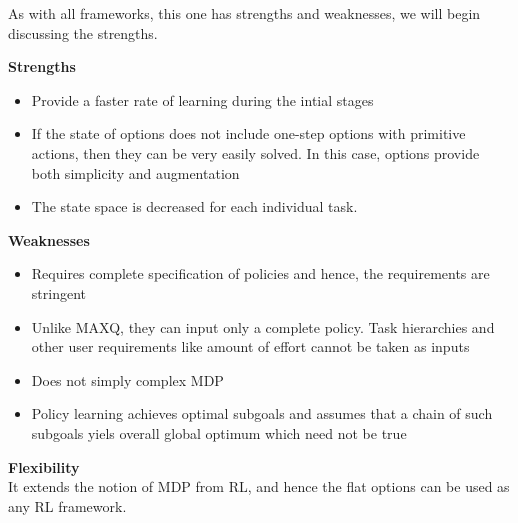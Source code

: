 As with all frameworks, this one has strengths and weaknesses, we will begin discussing the strengths.

\textbf{Strengths}
\begin{itemize}
    \item Provide a faster rate of learning during the intial stages
    \item If the state of options does not include one-step options with primitive actions, then they can be very easily solved. In this case, options provide both simplicity and augmentation
    \item The state space is decreased for each individual task.
\end{itemize}

\textbf{Weaknesses}
\begin{itemize}
    \item Requires complete specification of policies and hence, the requirements are stringent
    \item Unlike MAXQ, they can input only a complete policy. Task hierarchies and other user requirements like amount of effort cannot be taken as inputs
    \item Does not simply complex MDP
    \item Policy learning achieves optimal subgoals and assumes that a chain of such subgoals yiels overall global optimum which need not be true
\end{itemize}

\textbf{Flexibility} \\
It extends the notion of MDP from RL, and hence the flat options can be used as any RL framework. 
